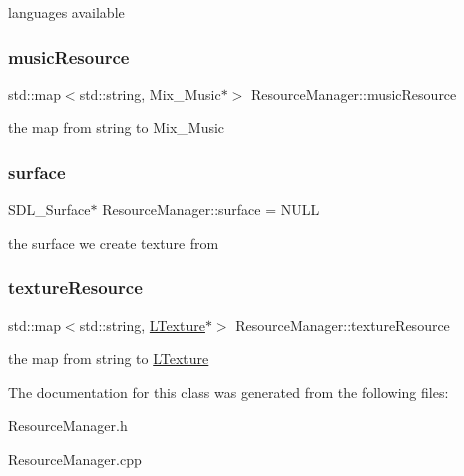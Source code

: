 languages available \mbox{\label{class_resource_manager_a927cffffb3a9199ad533328c5d464b56}} 
\subsubsection{\texorpdfstring{music\+Resource}{musicResource}}
{\footnotesize\ttfamily std\+::map$<$std\+::string, Mix\+\_\+\+Music$\ast$$>$ Resource\+Manager\+::music\+Resource\hspace{0.3cm}{\ttfamily [private]}}

the map from string to Mix\+\_\+\+Music \mbox{\label{class_resource_manager_a9c8ceb6493f5aeb3b32deca6bd302286}} 
\subsubsection{\texorpdfstring{surface}{surface}}
{\footnotesize\ttfamily S\+D\+L\+\_\+\+Surface$\ast$ Resource\+Manager\+::surface = N\+U\+LL\hspace{0.3cm}{\ttfamily [private]}}

the surface we create texture from \mbox{\label{class_resource_manager_a110ad3ce3aae0e775037628a2e57fd65}} 
\subsubsection{\texorpdfstring{texture\+Resource}{textureResource}}
{\footnotesize\ttfamily std\+::map$<$std\+::string, \mbox{\hyperlink{class_l_texture}{L\+Texture}}$\ast$$>$ Resource\+Manager\+::texture\+Resource\hspace{0.3cm}{\ttfamily [private]}}

the map from string to \mbox{\hyperlink{class_l_texture}{L\+Texture}} 

The documentation for this class was generated from the following files\+:\begin{DoxyCompactItemize}
\item 
Resource\+Manager.\+h\item 
Resource\+Manager.\+cpp\end{DoxyCompactItemize}
